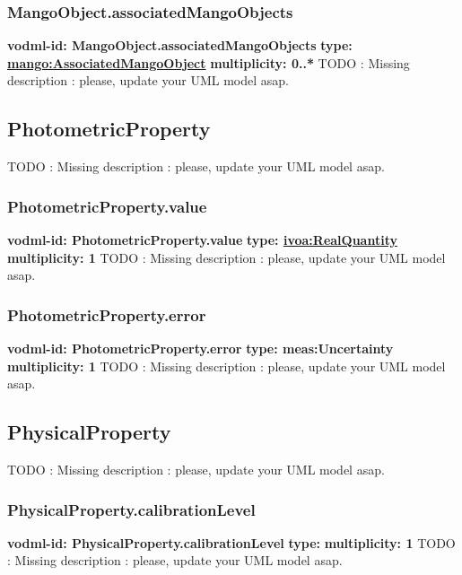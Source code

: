     \subsubsection{MangoObject.associatedMangoObjects}
      \textbf{vodml-id: MangoObject.associatedMangoObjects} \newline
      \textbf{type: \hyperref[sect:AssociatedMangoObject]{mango:AssociatedMangoObject}} \newline
      \textbf{multiplicity: 0..*} \newline
      TODO : Missing description : please, update your UML model asap.

  \subsection{PhotometricProperty}
  \label{sect:PhotometricProperty}
    TODO : Missing description : please, update your UML model asap.

    \subsubsection{PhotometricProperty.value}
      \textbf{vodml-id: PhotometricProperty.value} \newline
      \textbf{type: \hyperref[sect:ivoa]{ivoa:RealQuantity}} \newline
      \textbf{multiplicity: 1} \newline
      TODO : Missing description : please, update your UML model asap.

    \subsubsection{PhotometricProperty.error}
      \textbf{vodml-id: PhotometricProperty.error} \newline
      \textbf{type: meas:Uncertainty} \newline
      \textbf{multiplicity: 1} \newline
      TODO : Missing description : please, update your UML model asap.

  \subsection{PhysicalProperty}
  \label{sect:PhysicalProperty}
    TODO : Missing description : please, update your UML model asap.

    \subsubsection{PhysicalProperty.calibrationLevel}
      \textbf{vodml-id: PhysicalProperty.calibrationLevel} \newline
      \textbf{type: } \newline
      \textbf{multiplicity: 1} \newline
      TODO : Missing description : please, update your UML model asap.

